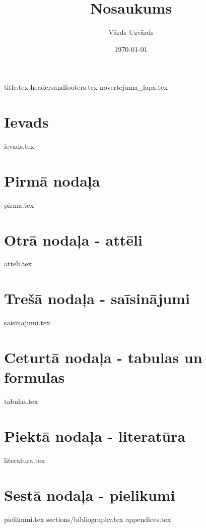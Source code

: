 \documentclass[a4paper,12pt]{article}
\author{Vārds Uzvārds}
\title{Nosaukums}
\date{\today}
\begin{document}
{title.tex}                  %
{headersandfooters.tex}      %
{novertejuma_lapa.tex}
\setcounter{page}{2}
\pagebreak
\printglossaries	                    %
\pagebreak
\tableofcontents
\thispagestyle{fancy}                   %
\pagebreak
\section*{Ievads}
{ievads.tex}
\pagebreak
\section{Pirmā nodaļa}
{pirma.tex}
\pagebreak
\section{Otrā nodaļa - attēli}
{atteli.tex}
\pagebreak
\section{Trešā nodaļa - saīsinājumi}
{saisinajumi.tex}
\pagebreak
\section{Ceturtā nodaļa - tabulas un formulas}
{tabulas.tex}
\pagebreak
\section{Piektā nodaļa - literatūra}
{literatura.tex}
\pagebreak
\section{Sestā nodaļa - pielikumi}
{pielikumi.tex}
\pagebreak
{sections/bibliography.tex}
\pagebreak
{appendices.tex}
\end{document}
